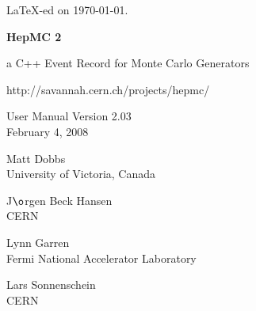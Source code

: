 \documentclass[11pt,letterpaper]{article}
\begin{document}
\newenvironment{fminipage}%
{\begin{Sbox}\begin{minipage}}%
{\end{minipage}\end{Sbox}\fbox{\TheSbox}}
%
%
%
\begin{titlepage}
{\tiny \LaTeX-ed on \today.}

\vspace{2cm}

\begin{center}

{\Huge\bf HepMC 2}

\vspace{1cm}

{\huge a C++ Event Record for Monte Carlo Generators }

\vspace{2cm}

{http://savannah.cern.ch/projects/hepmc/}

\vspace{1cm}

{\Large User Manual Version 2.03} \\
February 4, 2008

\vspace{2cm}

{\huge Matt Dobbs} \\
University of Victoria, Canada

\vspace{.2cm}

{\Large J$\o$rgen Beck Hansen} \\
CERN

\vspace{.2cm}

{\Large Lynn Garren} \\
Fermi National Accelerator Laboratory

\vspace{.2cm}

{\Large Lars Sonnenschein} \\
CERN

\vspace{1cm}


\end{center}
\end{titlepage}
\end{document}
